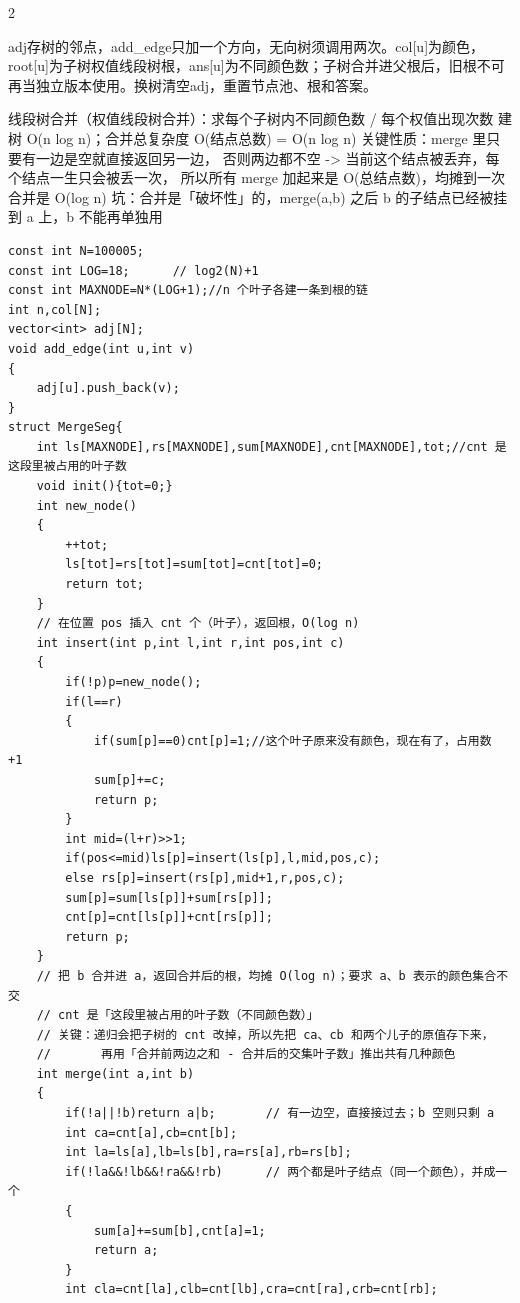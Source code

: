 \documentclass[UTF8,fontset=fandol,a4paper,twoside]{ctexart}
\newcommand{\note}[1]{{\fontsize{10}{12}\selectfont #1\par}}
\begin{document}
\begin{multicols}{2}
\note{adj存树的邻点，add\_edge只加一个方向，无向树须调用两次。col[\allowbreak{}u]\allowbreak{}为颜色，root[\allowbreak{}u]\allowbreak{}为子树权值线段树根，ans[\allowbreak{}u]\allowbreak{}为不同颜色数；子树合并进父根后，旧根不可再当独立版本使用。换树清空adj，重置节点池、根和答案。}
\note{线段树合并（权值线段树合并）：求每个子树内不同颜色数 /\allowbreak{} 每个权值出现次数 建树 O(\allowbreak{}n log n)\allowbreak{}；合并总复杂度 O(\allowbreak{}结点总数)\allowbreak{} =\allowbreak{} O(\allowbreak{}n log n)\allowbreak{} 关键性质：merge 里只要有一边是空就直接返回另一边， 否则两边都不空 -\allowbreak{}>\allowbreak{} 当前这个结点被丢弃，每个结点一生只会被丢一次， 所以所有 merge 加起来是 O(\allowbreak{}总结点数)\allowbreak{}，均摊到一次合并是 O(\allowbreak{}log n)\allowbreak{} 坑：合并是「破坏性」的，merge(\allowbreak{}a,\allowbreak{}b)\allowbreak{} 之后 b 的子结点已经被挂到 a 上，b 不能再单独用}
\begin{lstlisting}
const int N=100005;
const int LOG=18;      // log2(N)+1
const int MAXNODE=N*(LOG+1);//n 个叶子各建一条到根的链
int n,col[N];
vector<int> adj[N];
void add_edge(int u,int v)
{
    adj[u].push_back(v);
}
struct MergeSeg{
    int ls[MAXNODE],rs[MAXNODE],sum[MAXNODE],cnt[MAXNODE],tot;//cnt 是这段里被占用的叶子数
    void init(){tot=0;}
    int new_node()
    {
        ++tot;
        ls[tot]=rs[tot]=sum[tot]=cnt[tot]=0;
        return tot;
    }
    // 在位置 pos 插入 cnt 个（叶子），返回根，O(log n)
    int insert(int p,int l,int r,int pos,int c)
    {
        if(!p)p=new_node();
        if(l==r)
        {
            if(sum[p]==0)cnt[p]=1;//这个叶子原来没有颜色，现在有了，占用数 +1
            sum[p]+=c;
            return p;
        }
        int mid=(l+r)>>1;
        if(pos<=mid)ls[p]=insert(ls[p],l,mid,pos,c);
        else rs[p]=insert(rs[p],mid+1,r,pos,c);
        sum[p]=sum[ls[p]]+sum[rs[p]];
        cnt[p]=cnt[ls[p]]+cnt[rs[p]];
        return p;
    }
    // 把 b 合并进 a，返回合并后的根，均摊 O(log n)；要求 a、b 表示的颜色集合不交
    // cnt 是「这段里被占用的叶子数（不同颜色数）」
    // 关键：递归会把子树的 cnt 改掉，所以先把 ca、cb 和两个儿子的原值存下来，
    //       再用「合并前两边之和 - 合并后的交集叶子数」推出共有几种颜色
    int merge(int a,int b)
    {
        if(!a||!b)return a|b;       // 有一边空，直接接过去；b 空则只剩 a
        int ca=cnt[a],cb=cnt[b];
        int la=ls[a],lb=ls[b],ra=rs[a],rb=rs[b];
        if(!la&&!lb&&!ra&&!rb)      // 两个都是叶子结点（同一个颜色），并成一个
        {
            sum[a]+=sum[b],cnt[a]=1;
            return a;
        }
        int cla=cnt[la],clb=cnt[lb],cra=cnt[ra],crb=cnt[rb];

\end{lstlisting}
\end{multicols}
\end{document}
